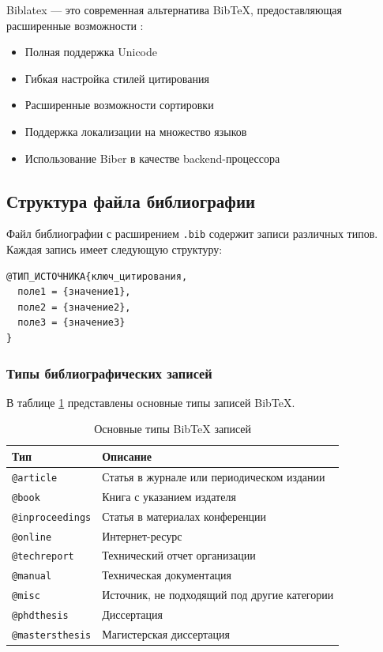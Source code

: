 \documentclass[12pt, a4paper]{article}
\begin{document}
Biblatex — это современная альтернатива BibTeX, предоставляющая расширенные возможности \parencite{biblatex-manual}:

\begin{itemize}
  \item Полная поддержка Unicode
  \item Гибкая настройка стилей цитирования
  \item Расширенные возможности сортировки
  \item Поддержка локализации на множество языков
  \item Использование Biber в качестве backend-процессора \parencite{biber-manual}
\end{itemize}

\subsection{Структура файла библиографии}

Файл библиографии с расширением \texttt{.bib} содержит записи различных типов. Каждая запись имеет следующую структуру:

\begin{lstlisting}[language=TeX, caption={Общая структура BibTeX записи}]
@ТИП_ИСТОЧНИКА{ключ_цитирования,
  поле1 = {значение1},
  поле2 = {значение2},
  поле3 = {значение3}
}
\end{lstlisting}

\subsubsection{Типы библиографических записей}

В таблице \ref{tab:bibtex-types} представлены основные типы записей BibTeX.

\begin{table}[htbp]
  \centering
  \caption{Основные типы BibTeX записей}
  \label{tab:bibtex-types}
  \begin{tabular}{@{}lp{8cm}@{}}
    \toprule
    \textbf{Тип} & \textbf{Описание} \\
    \midrule
    \texttt{@article} & Статья в журнале или периодическом издании \\
    \texttt{@book} & Книга с указанием издателя \\
    \texttt{@inproceedings} & Статья в материалах конференции \\
    \texttt{@online} & Интернет-ресурс \\
    \texttt{@techreport} & Технический отчет организации \\
    \texttt{@manual} & Техническая документация \\
    \texttt{@misc} & Источник, не подходящий под другие категории \\
    \texttt{@phdthesis} & Диссертация \\
    \texttt{@mastersthesis} & Магистерская диссертация \\
    \bottomrule
  \end{tabular}
\end{table}
\end{document}
